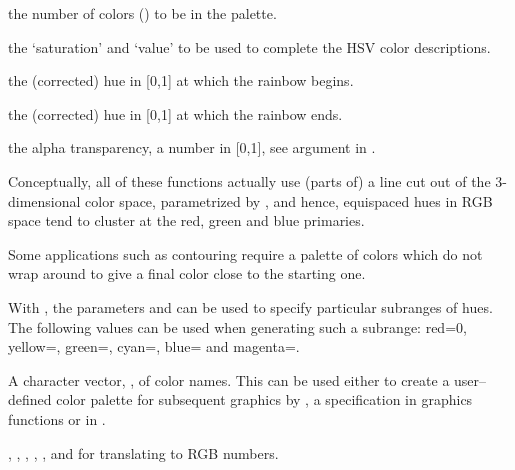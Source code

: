 %
\begin{Arguments}
\begin{ldescription}
\item[\code{n}] the number of colors () to be in the
palette.
\item[\code{s,v}] the `saturation' and `value' to be used
to complete the HSV color descriptions.
\item[\code{start}] the (corrected) hue in [0,1] at which the rainbow
begins.
\item[\code{end}] the (corrected) hue in [0,1] at which the rainbow ends.
\item[\code{alpha}] the alpha transparency, a number in [0,1], see argument
 in .
\end{ldescription}
\end{Arguments}
%
\begin{Details}\relax
Conceptually, all of these functions actually use (parts of) a line
cut out of the 3-dimensional color space, parametrized by
, and hence,
equispaced hues in RGB space tend to cluster at
the red, green and blue primaries.

Some applications such as contouring require a palette
of colors which do not wrap around to give a final
color close to the starting one.

With , the parameters  and  can be used
to specify particular subranges of hues.
The following values can be used when generating such a subrange:
red=0, yellow=, green=,
cyan=, blue=
and magenta=.
\end{Details}
%
\begin{Value}
A character vector, , of color names.  This can be used
either to create a user--defined color palette for subsequent
graphics by , a  specification
in graphics functions or in .
\end{Value}
%
\begin{SeeAlso}\relax
{}, , ,
, ,  and
 for translating to RGB numbers.
\end{SeeAlso}
%

